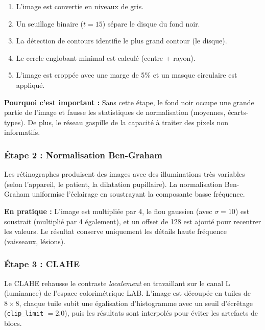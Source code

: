 \documentclass[11pt,a4paper]{article}
\begin{document}
\begin{infobox}
\begin{enumerate}[leftmargin=1.5em]
  \item L'image est convertie en niveaux de gris.
  \item Un seuillage binaire ($t = 15$) sépare le disque du fond noir.
  \item La détection de contours identifie le plus grand contour (le disque).
  \item Le cercle englobant minimal est calculé (centre + rayon).
  \item L'image est croppée avec une marge de 5\% et un masque circulaire est appliqué.
\end{enumerate}
\end{infobox}

\textbf{Pourquoi c'est important :} Sans cette étape, le fond noir occupe une grande partie de l'image et fausse les statistiques de normalisation (moyennes, écarts-types). De plus, le réseau gaspille de la capacité à traiter des pixels non informatifs.

\subsubsection{Étape 2 : Normalisation Ben-Graham}

Les rétinographes produisent des images avec des illuminations très variables (selon l'appareil, le patient, la dilatation pupillaire). La normalisation Ben-Graham uniformise l'éclairage en soustrayant la composante basse fréquence.

\textbf{En pratique :} L'image est multipliée par 4, le flou gaussien (avec $\sigma = 10$) est soustrait (multiplié par 4 également), et un offset de 128 est ajouté pour recentrer les valeurs. Le résultat conserve uniquement les détails haute fréquence (vaisseaux, lésions).

\subsubsection{Étape 3 : CLAHE}

Le CLAHE rehausse le contraste \emph{localement} en travaillant sur le canal L (luminance) de l'espace colorimétrique LAB. L'image est découpée en tuiles de $8 \times 8$, chaque tuile subit une égalisation d'histogramme avec un seuil d'écrêtage (\texttt{clip\_limit} $= 2.0$), puis les résultats sont interpolés pour éviter les artefacts de blocs.
\end{document}
